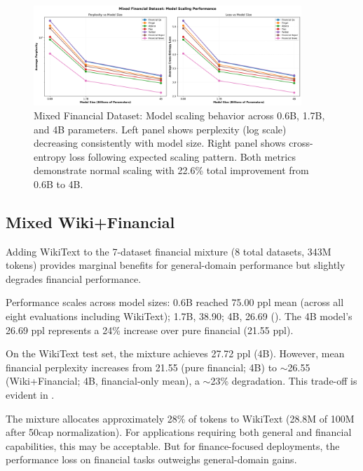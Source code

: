 \begin{figure}[htbp]
\centering
\includegraphics[width=0.9\textwidth]{figures/scaling_mixed_financial.png}
\caption[Mixed Financial Dataset: Scaling Behavior]{Mixed Financial Dataset: Model scaling behavior across 0.6B, 1.7B, and 4B parameters. Left panel shows perplexity (log scale) decreasing consistently with model size. Right panel shows cross-entropy loss following expected scaling pattern. Both metrics demonstrate normal scaling with 22.6\% total improvement from 0.6B to 4B.}
\label{fig:scaling_mixed_financial}
\end{figure}



\subsection{Mixed Wiki+Financial}

Adding WikiText to the 7-dataset financial mixture (8 total datasets, 343M tokens) provides marginal benefits for general-domain performance but slightly degrades financial performance.

Performance scales across model sizes: 0.6B reached 75.00 ppl mean (across all eight evaluations including WikiText); 1.7B, 38.90; 4B, 26.69 (). The 4B model's 26.69 ppl represents a 24\% increase over pure financial (21.55 ppl).

On the WikiText test set, the mixture achieves 27.72 ppl (4B). However, mean financial perplexity increases from 21.55 (pure financial; 4B) to $\sim$26.55 (Wiki+Financial; 4B, financial-only mean), a $\sim$23\% degradation. This trade-off is evident in .

The mixture allocates approximately 28\% of tokens to WikiText (28.8M of 100M after 50cap normalization). For applications requiring both general and financial capabilities, this may be acceptable. But for finance-focused deployments, the performance loss on financial tasks outweighs general-domain gains.

